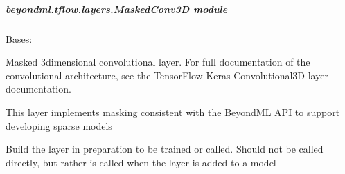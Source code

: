 \documentclass[letterpaper,10pt,english]{sphinxmanual}
\begin{document}
\subparagraph{beyondml.tflow.layers.MaskedConv3D module}
\label{\detokenize{beyondml.tflow.layers:module-beyondml.tflow.layers.MaskedConv3D}}\label{\detokenize{beyondml.tflow.layers:beyondml-tflow-layers-maskedconv3d-module}}

\begin{fulllineitems}
\label{\detokenize{beyondml.tflow.layers:beyondml.tflow.layers.MaskedConv3D.MaskedConv3D}}
\pysigstartsignatures
{}
\pysigstopsignatures
\sphinxAtStartPar
Bases: 

\sphinxAtStartPar
Masked 3\sphinxhyphen{}dimensional convolutional layer. For full documentation of the
convolutional architecture, see the TensorFlow Keras Convolutional3D layer documentation.

\sphinxAtStartPar
This layer implements masking consistent with the BeyondML API to support
developing sparse models

\begin{fulllineitems}
\label{\detokenize{beyondml.tflow.layers:beyondml.tflow.layers.MaskedConv3D.MaskedConv3D.build}}
\pysigstartsignatures
{}
\pysigstopsignatures
\sphinxAtStartPar
Build the layer in preparation to be trained or called. Should not be called directly,
but rather is called when the layer is added to a model

\end{fulllineitems}



\end{fulllineitems}
\end{document}
